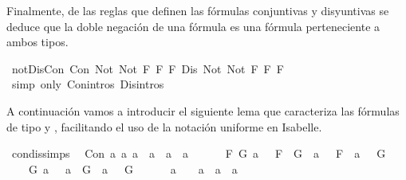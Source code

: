 \begin{isabellebody}
\begin{isamarkuptext}
Finalmente, de las reglas que definen las fórmulas conjuntivas y disyuntivas se deduce que
  la doble negación de una fórmula es una fórmula perteneciente a ambos tipos.%
\end{isamarkuptext}\isamarkuptrue%
\isamarkupfalse%
\ notDisCon{\isacharcolon}\ {\isachardoublequoteopen}Con\ {\isacharparenleft}Not\ {\isacharparenleft}Not\ F{\isacharparenright}{\isacharparenright}\ F\ F{\isachardoublequoteclose}\ {\isachardoublequoteopen}Dis\ {\isacharparenleft}Not\ {\isacharparenleft}Not\ F{\isacharparenright}{\isacharparenright}\ F\ F{\isachardoublequoteclose}\ \isanewline
%
\isadelimproof
\ \ %
\endisadelimproof
%
\isatagproof
{}\isamarkupfalse%
\ {\isacharparenleft}simp\ only{\isacharcolon}\ Con{\isachardot}intros{\isacharparenleft}{}{\isacharparenright}\ Dis{\isachardot}intros{\isacharparenleft}{}{\isacharparenright}{\isacharparenright}{\isacharplus}%
\endisatagproof
{\isafoldproof}%
%
\isadelimproof
%
\endisadelimproof
%
\begin{isamarkuptext}%
A continuación vamos a introducir el siguiente lema que caracteriza las fórmulas de tipo \isa{{\isasymalpha}} 
  y \isa{{\isasymbeta}}, facilitando el uso de la notación uniforme en Isabelle.%
\end{isamarkuptext}\isamarkuptrue%
\isamarkupfalse%
\ con{\isacharunderscore}dis{\isacharunderscore}simps{\isacharcolon}\isanewline
\ \ {\isachardoublequoteopen}Con\ a{}\ a{}\ a{}\ {\isacharequal}\ {\isacharparenleft}a{}\ {\isacharequal}\ a{}\ \isactrlbold {\isasymand}\ a{}\ {\isasymor}\ \isanewline
\ \ \ \ {\isacharparenleft}{\isasymexists}F\ G{\isachardot}\ a{}\ {\isacharequal}\ \isactrlbold {\isasymnot}\ {\isacharparenleft}F\ \isactrlbold {\isasymor}\ G{\isacharparenright}\ {\isasymand}\ a{}\ {\isacharequal}\ \isactrlbold {\isasymnot}\ F\ {\isasymand}\ a{}\ {\isacharequal}\ \isactrlbold {\isasymnot}\ G{\isacharparenright}\ {\isasymor}\ \isanewline
\ \ \ \ {\isacharparenleft}{\isasymexists}G{\isachardot}\ a{}\ {\isacharequal}\ \isactrlbold {\isasymnot}\ {\isacharparenleft}a{}\ \isactrlbold {\isasymrightarrow}\ G{\isacharparenright}\ {\isasymand}\ a{}\ {\isacharequal}\ \isactrlbold {\isasymnot}\ G{\isacharparenright}\ {\isasymor}\ \isanewline
\ \ \ \ a{}\ {\isacharequal}\ \isactrlbold {\isasymnot}\ {\isacharparenleft}\isactrlbold {\isasymnot}\ a{}{\isacharparenright}\ {\isasymand}\ a{}\ {\isacharequal}\ a{}{\isacharparenright}{\isachardoublequoteclose}\isanewline

\end{isabellebody}
